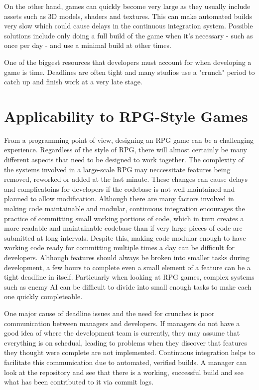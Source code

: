 \documentclass{scrartcl}
\begin{document}
On the other hand, games can quickly become very large as they usually include assets such as 3D models, shaders and textures. This can make automated builds very slow which could cause delays in the continuous integration system. Possible solutions include only doing a full build of the game when it's necessary - such as once per day - and use a minimal build at other times.

One of the biggest resources that developers must account for when developing a game is time. Deadlines are often tight and many studios use a "crunch" period to catch up and finish work at a very late stage. 


\section{Applicability to RPG-Style Games}

From a programming point of view, designing an RPG game can be a challenging experience. Regardless of the style of RPG, there will almost certainly be many different aspects that need to be designed to work together. The complexity of the systems involved in a large-scale RPG may neccessitate features being removed, reworked or added at the last minute. These changes can cause delays and complicatoins for developers if the codebase is not well-maintained and planned to allow modification. Although there are many factors involved in making code maintainable and modular, continuous integration encourages the practice of committing small working portions of code, which in turn creates a more readable and maintainable codebase than if very large pieces of code are submitted at long intervals. Despite this, making code modular enough to have working code ready for committing multiple times a day can be difficult for developers. Although features should always be broken into smaller tasks during development, a few hours to complete even a small element of a feature can be a tight deadline in itself. Particuarly when looking at RPG games, complex systems such as enemy AI can be difficult to divide into small enough tasks to make each one quickly completeable.

One major cause of deadline issues and the need for crunches is poor communication between managers and developers. If managers do not have a good idea of where the development team is currently, they may assume that everything is on schedual, leading to problems when they discover that features they thought were complete are not implemented. Continuous integration helps to facilitate this communication due to automated, verified builds. A manager can look at the repository and see that there is a working, successful build and see what has been contributed to it via commit logs.
\end{document}
